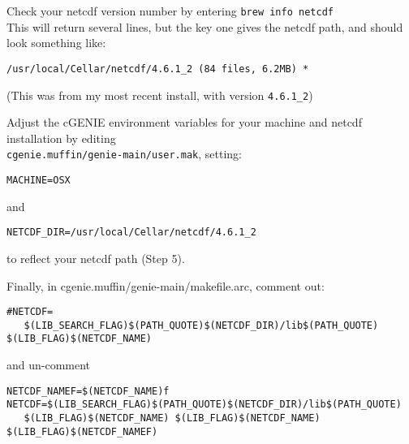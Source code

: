 \documentclass[10pt,twoside]{article}
\begin{document}
\begin{compactenum}
\item Check your netcdf version number by entering \texttt{brew info netcdf}\\
This will return several lines, but the key one gives the netcdf path, and should look something like:
\vspace{-5pt}\begin{verbatim}
/usr/local/Cellar/netcdf/4.6.1_2 (84 files, 6.2MB) *
\end{verbatim}\vspace{-5pt}
(This was from my most recent install, with version \texttt{4.6.1\_2})

\item Adjust the cGENIE environment variables for your machine and netcdf installation by editing
\\\texttt{cgenie.muffin/genie-main/user.mak}, setting:
\vspace{-5pt}\begin{verbatim}
MACHINE=OSX
\end{verbatim}\vspace{-5pt}
and
\vspace{-5pt}\begin{verbatim}
NETCDF_DIR=/usr/local/Cellar/netcdf/4.6.1_2
\end{verbatim} \vspace{-5pt}
to reflect your netcdf path (Step 5).

\item Finally, in cgenie.muffin/genie-main/makefile.arc, comment out:
\vspace{-5pt}\begin{verbatim}
#NETCDF=
   $(LIB_SEARCH_FLAG)$(PATH_QUOTE)$(NETCDF_DIR)/lib$(PATH_QUOTE) $(LIB_FLAG)$(NETCDF_NAME)
\end{verbatim}\vspace{-5pt}
and un-comment 
\vspace{-5pt}\begin{verbatim}
NETCDF_NAMEF=$(NETCDF_NAME)f
NETCDF=$(LIB_SEARCH_FLAG)$(PATH_QUOTE)$(NETCDF_DIR)/lib$(PATH_QUOTE) 
   $(LIB_FLAG)$(NETCDF_NAME) $(LIB_FLAG)$(NETCDF_NAME) $(LIB_FLAG)$(NETCDF_NAMEF)
\end{verbatim}


\end{compactenum}
\end{document}
